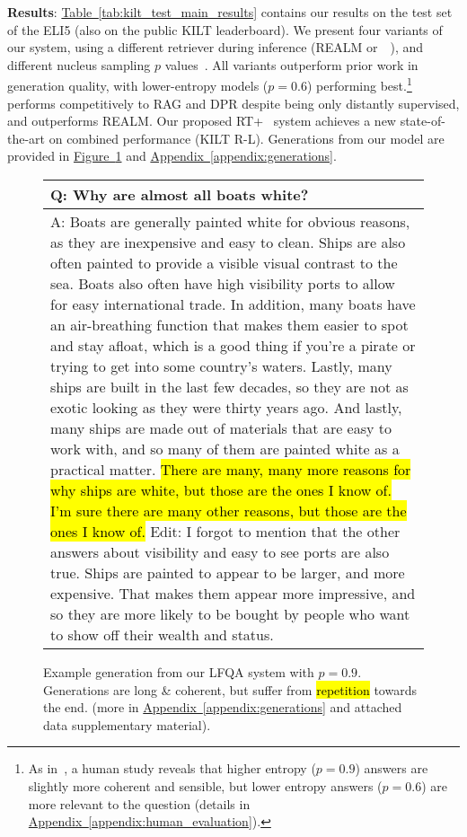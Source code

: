 \documentclass[11pt]{article}
\newcommand{\namedref}[2]{\hyperref[#2]{#1~\ref*{#2}}}
\newcommand{\tableref}[1]{\namedref{Table}{#1}}
\newcommand{\figureref}[1]{\namedref{Figure}{#1}}
\newcommand{\appendixref}[1]{\namedref{Appendix}{#1}}
\newcommand{\retriever}[1]{\textsc{c-REALM}}
\begin{document}
\noindent \textbf{Results}:  \tableref{tab:kilt_test_main_results} contains our results on the test set of the ELI5 (also on the public KILT leaderboard). We present four variants of our system, using a different retriever during inference (REALM or~\retriever~), and different nucleus sampling $p$ values~\citep{holtzman2020curious}. All variants outperform prior work in generation quality,
with lower-entropy models ($p=0.6$) performing best.\footnote{As in~\citet{holtzman2020curious}, a human study reveals that higher entropy ($p=0.9$) answers are slightly more coherent and sensible, but lower entropy answers ($p=0.6$) are more relevant to the question (details in \appendixref{appendix:human_evaluation}).} ~\retriever~ performs competitively to RAG and DPR despite being only distantly supervised, and outperforms REALM. Our proposed RT+\retriever~ system achieves a new state-of-the-art on combined performance (KILT R-L). Generations from our model are provided in \figureref{fig:generations_main} and \appendixref{appendix:generations}.


\begin{figure}[t]
    \footnotesize
    \centering
\begin{tabular}{p{}}
    \toprule
  Q: Why are almost all boats white?\\
  \midrule
  A: Boats are generally painted white for obvious reasons, as they are inexpensive and easy to clean. Ships are also often painted to provide a visible visual contrast to the sea. Boats also often have high visibility ports to allow for easy international trade. In addition, many boats have an air-breathing function that makes them easier to spot and stay afloat, which is a good thing if you're a pirate or trying to get into some country's waters. Lastly, many ships are built in the last few decades, so they are not as exotic looking as they were thirty years ago. And lastly, many ships are made out of materials that are easy to work with, and so many of them are painted white as a practical matter. \hl{There are many, many more reasons for why ships are white, but those are the ones I know of. I'm sure there are many other reasons, but those are the ones I know of.} Edit: I forgot to mention that the other answers about visibility and easy to see ports are also true. Ships are painted to appear to be larger, and more expensive. That makes them appear more impressive, and so they are more likely to be bought by people who want to show off their wealth and status.\\
  \bottomrule
       \end{tabular}
\caption{Example generation from our LFQA system with \(p=0.9\). Generations are long \& coherent, but suffer from \hl{repetition} towards the end. (more in \appendixref{appendix:generations} and attached data supplementary material).}
    \label{fig:generations_main}
\end{figure}
\end{document}

